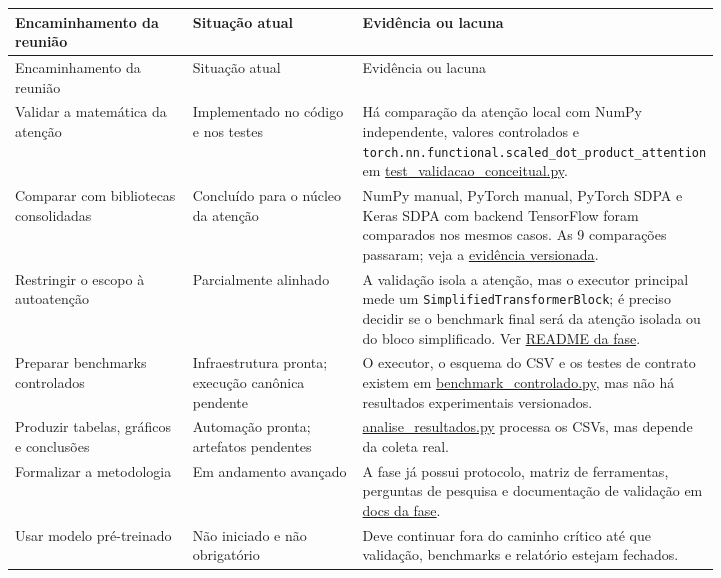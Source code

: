 \begin{longtable}{@{}>{\RaggedRight\arraybackslash}p{0.273\linewidth}>{\RaggedRight\arraybackslash}p{0.273\linewidth}>{\RaggedRight\arraybackslash}p{0.273\linewidth}@{}}
\toprule
Encaminhamento da reunião & Situação atual & Evidência ou lacuna \\
\midrule
\endfirsthead
\toprule
Encaminhamento da reunião & Situação atual & Evidência ou lacuna \\
\midrule
\endhead
Validar a matemática da atenção & Implementado no código e nos testes & Há comparação da atenção local com NumPy independente, valores controlados e \texttt{torch.\allowbreak{}nn.\allowbreak{}functional.\allowbreak{}scaled\_\allowbreak{}dot\_\allowbreak{}product\_\allowbreak{}attention} em \href{../../../fases/01_validacao_conceitual/tests/test_validacao_conceitual.py}{test\_\allowbreak{}validacao\_\allowbreak{}conceitual.py}. \\
Comparar com bibliotecas consolidadas & Concluído para o núcleo da atenção & NumPy manual, PyTorch manual, PyTorch SDPA e Keras SDPA com backend TensorFlow foram comparados nos mesmos casos. As 9 comparações passaram; veja a \href{../../../fases/01_validacao_conceitual/evidencias/comparacao_frameworks/comparacao_atencao.tex}{evidência versionada}. \\
Restringir o escopo à autoatenção & Parcialmente alinhado & A validação isola a atenção, mas o executor principal mede um \texttt{Simplified\allowbreak{}Transformer\allowbreak{}Block}; é preciso decidir se o benchmark final será da atenção isolada ou do bloco simplificado. Ver \href{../../../fases/01_validacao_conceitual/README.md}{README da fase}. \\
Preparar benchmarks controlados & Infraestrutura pronta; execução canônica pendente & O executor, o esquema do CSV e os testes de contrato existem em \href{../../../fases/01_validacao_conceitual/validacao/benchmark_controlado.py}{benchmark\_\allowbreak{}controlado.py}, mas não há resultados experimentais versionados. \\
Produzir tabelas, gráficos e conclusões & Automação pronta; artefatos pendentes & \href{../../../fases/01_validacao_conceitual/validacao/analise_resultados.py}{analise\_\allowbreak{}resultados.py} processa os CSVs, mas depende da coleta real. \\
Formalizar a metodologia & Em andamento avançado & A fase já possui protocolo, matriz de ferramentas, perguntas de pesquisa e documentação de validação em \href{../../../fases/01_validacao_conceitual/docs/}{docs da fase}. \\
Usar modelo pré-treinado & Não iniciado e não obrigatório & Deve continuar fora do caminho crítico até que validação, benchmarks e relatório estejam fechados. \\
\bottomrule
\end{longtable}





